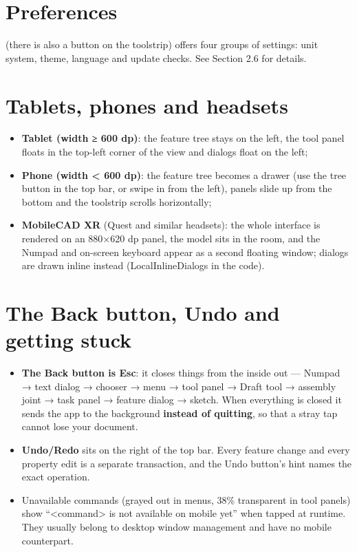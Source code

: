 
\section{Preferences}

 (there is also a  button on the toolstrip) offers four groups of
settings: unit system, theme, language and update checks. See Section 2.6 for details.

\section{Tablets, phones and headsets}

\begin{itemize}
  \item \textbf{Tablet (width ≥ 600 dp)}: the feature tree stays on the left, the tool panel floats in the
        top-left corner of the view and dialogs float on the left;
  \item \textbf{Phone (width < 600 dp)}: the feature tree becomes a drawer (use the tree button in the top bar,
        or swipe in from the left), panels slide up from the bottom and the toolstrip scrolls horizontally;
  \item \textbf{MobileCAD XR} (Quest and similar headsets): the whole interface is rendered on an 880×620 dp
        panel, the model sits in the room, and the Numpad and on-screen keyboard appear as a second floating
        window; dialogs are drawn inline instead (LocalInlineDialogs in the code).
\end{itemize}

\section{The Back button, Undo and getting stuck}

\begin{itemize}
  \item \textbf{The Back button is Esc}: it closes things from the inside out — Numpad → text dialog → chooser
        → menu → tool panel → Draft tool → assembly joint → task panel → feature dialog → sketch. When
        everything is closed it sends the app to the background \textbf{instead of quitting}, so that a stray
        tap cannot lose your document.
  \item \textbf{Undo/Redo} sits on the right of the top bar. Every feature change and every property edit is a
        separate transaction, and the Undo button's hint names the exact operation.
  \item Unavailable commands (grayed out in menus, 38\% transparent in tool panels) show “<command> is not
        available on mobile yet” when tapped at runtime. They usually belong to desktop window management and
        have no mobile counterpart.
\end{itemize}

